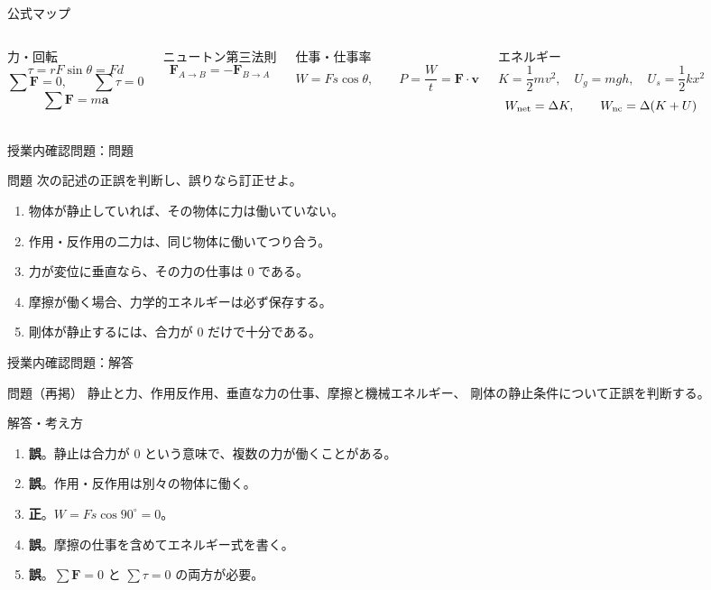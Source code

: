 \documentclass[notheorems,aspectratio=169]{beamer}
\newcommand{\jp}[1]{\textbf{\color{JapanBlue}#1}}
\newcommand{\key}[1]{\textbf{\color{ChinaRed}#1}}
\newcommand{\qcard}[1]{%
  \begin{block}{問題}\centering\large #1\end{block}}
\newcommand{\qsmall}[1]{%
  \begin{block}{問題（再掲）}\small #1\end{block}}
\newcommand{\acard}[1]{%
  \begin{exampleblock}{解答・考え方}#1\end{exampleblock}}
\newcommand{\vect}[1]{\bm{#1}}
\begin{document}
\begin{frame}{公式マップ}
  \begin{columns}[T,onlytextwidth]
    \begin{block}{力・回転}
      \[
        \tau=rF\sin\theta=Fd
      \]
      \[
        \sum\vect F=0,\qquad \sum\tau=0
      \]
      \[
        \sum\vect F=m\vect a
      \]
    \end{block}
    \begin{block}{ニュートン第三法則}
      \[
        \vect F_{A\to B}=-\vect F_{B\to A}
      \]
    \end{block}
    \begin{block}{仕事・仕事率}
      \[
        W=Fs\cos\theta,\qquad P=\frac Wt=\vect F\cdot\vect v
      \]
    \end{block}
    \begin{block}{エネルギー}
      \[
        K=\frac12mv^2,\quad U_g=mgh,\quad U_s=\frac12kx^2
      \]
      \[
        W_{\rm net}=\Delta K,\qquad
        W_{\rm nc}=\Delta(K+U)
      \]
    \end{block}
  \end{columns}
\end{frame}

\begin{frame}{授業内確認問題：問題}
  \qcard{
    次の記述の正誤を判断し、誤りなら訂正せよ。
    \begin{enumerate}
      \item 物体が静止していれば、その物体に力は働いていない。
      \item 作用・反作用の二力は、同じ物体に働いてつり合う。
      \item 力が変位に垂直なら、その力の仕事は 0 である。
      \item 摩擦が働く場合、力学的エネルギーは必ず保存する。
      \item 剛体が静止するには、合力が 0 だけで十分である。
    \end{enumerate}
  }
\end{frame}

\begin{frame}{授業内確認問題：解答}
  \qsmall{
    静止と力、作用反作用、垂直な力の仕事、摩擦と機械エネルギー、
    剛体の静止条件について正誤を判断する。
  }
  \acard{
    \begin{enumerate}
      \item \key{誤}。静止は合力が 0 という意味で、複数の力が働くことがある。
      \item \key{誤}。作用・反作用は別々の物体に働く。
      \item \jp{正}。$W=Fs\cos90^\circ=0$。
      \item \key{誤}。摩擦の仕事を含めてエネルギー式を書く。
      \item \key{誤}。$\sum\vect F=0$ と $\sum\tau=0$ の両方が必要。
    \end{enumerate}
  }
\end{frame}
\end{document}
